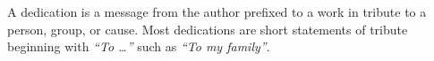 \begin{dedication}
A dedication is a message from the author prefixed to a work in tribute to a person, group, or cause. Most dedications are short statements of tribute beginning with \textit{``To \ldots''} such as \textit{``To my family''}.
\end{dedication}

